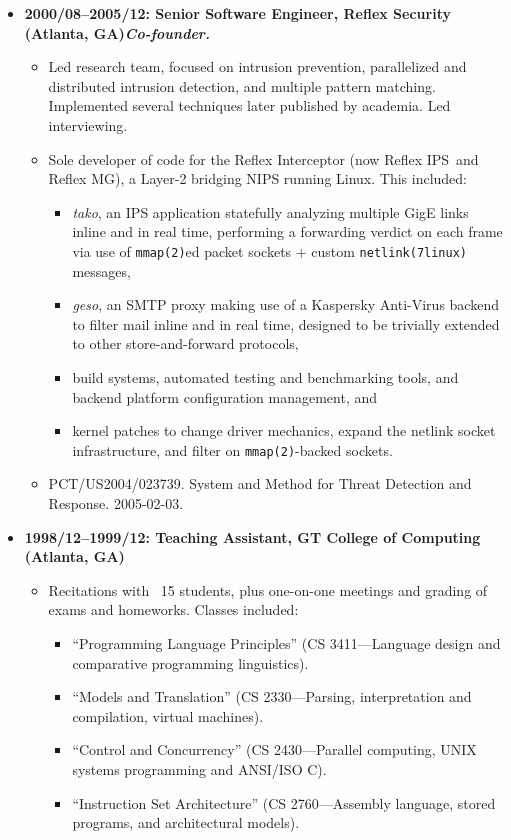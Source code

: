 \documentclass{article}
\newenvironment{tightitemize}
{\begin{itemize}
  \setlength{\itemsep}{1pt}
  \setlength{\parskip}{0pt}
  \setlength{\parsep}{0pt}}
{\end{itemize}}
\begin{document}
\begin{tightitemize}
\pagebreak

\item \textbf{2000/08--2005/12: Senior Software Engineer, Reflex Security (Atlanta, GA)\hfill \tiny{\textit{Co-founder.}}}
\begin{tightitemize}
\item Led research team, focused on intrusion prevention, parallelized and
  distributed intrusion detection, and multiple pattern matching. Implemented
  several techniques later published by academia. Led interviewing.
\item Sole developer of code for the Reflex Interceptor (now Reflex IPS\texttrademark\ and
  Reflex MG\texttrademark), a Layer-2 bridging NIPS running Linux. This included:
\begin{tightitemize}
    \item \textit{tako}, an IPS application statefully analyzing multiple GigE links inline
      and in real time, performing a forwarding verdict on each frame via use
      of \texttt{mmap(2)}ed packet sockets + custom \texttt{netlink(7linux)} messages,
    \item \textit{geso}, an SMTP proxy making use of a Kaspersky Anti-Virus backend to
      filter mail inline and in real time, designed to be trivially extended
      to other store-and-forward protocols,
    \item build systems, automated testing and benchmarking tools, and backend
      platform configuration management, and
    \item kernel patches to change driver mechanics, expand the netlink socket
      infrastructure, and filter on \texttt{mmap(2)}-backed sockets.
\end{tightitemize}
\item PCT/US2004/023739. System and Method for Threat Detection and Response. 2005-02-03.\hfill {}\\
\end{tightitemize}

\item \textbf{1998/12--1999/12: Teaching Assistant, GT College of Computing (Atlanta, GA)}
\begin{tightitemize}
\item Recitations with ~15 students, plus one-on-one meetings and grading of exams
and homeworks. Classes included:
\begin{tightitemize}
\item ``Programming Language Principles'' (CS 3411---Language design and comparative programming linguistics).
\item ``Models and Translation'' (CS 2330---Parsing, interpretation and compilation, virtual machines).
\item ``Control and Concurrency'' (CS 2430---Parallel computing, UNIX systems programming and ANSI/ISO C).
\item ``Instruction Set Architecture'' (CS 2760---Assembly language, stored programs, and architectural models).\\
\end{tightitemize}
\end{tightitemize}


\end{tightitemize}
\end{document}
